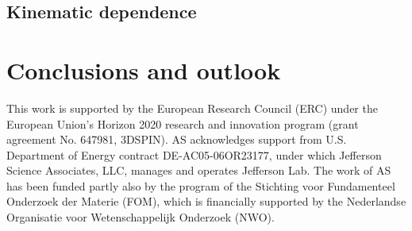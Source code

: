 \documentclass[aps,preprintnumbers,showpacs,nofootinbib,superscriptaddress,floatfix]{revtex4}
\begin{document}
\subsection{Kinematic dependence}
\label{ss:kindep}








\section{Conclusions and outlook}
\label{s:end}






\begin{acknowledgments}
This work is supported by the European Research Council (ERC) under the European Union's Horizon 2020 research and innovation program (grant agreement No. 647981, 3DSPIN). 
AS acknowledges support from U.S. Department of Energy contract DE-AC05-06OR23177, under which Jefferson Science Associates, LLC, manages and operates Jefferson Lab. 
The work of AS has been funded partly also by the program of the Stichting voor Fundamenteel Onderzoek der Materie (FOM), which is financially supported by the Nederlandse Organisatie voor Wetenschappelijk Onderzoek (NWO).
\end{acknowledgments}



%
%


%
%
\end{document}
